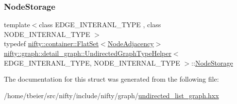 \mbox{\label{structnifty_1_1graph_1_1detail__graph_1_1UndirectedGraphTypeHelper_a55013bcacc1d016637b29ab2c33ac52a}} 
\subsubsection{\texorpdfstring{Node\+Storage}{NodeStorage}}
{\footnotesize\ttfamily template$<$class E\+D\+G\+E\+\_\+\+I\+N\+T\+E\+R\+A\+N\+L\+\_\+\+T\+Y\+PE , class N\+O\+D\+E\+\_\+\+I\+N\+T\+E\+R\+N\+A\+L\+\_\+\+T\+Y\+PE $>$ \\
typedef \hyperlink{classnifty_1_1container_1_1FlatSet}{nifty\+::container\+::\+Flat\+Set}$<$\hyperlink{structnifty_1_1graph_1_1detail__graph_1_1UndirectedGraphTypeHelper_a626e3edd4cc8c7e33ec89e6a7454561a}{Node\+Adjacency}$>$ \hyperlink{structnifty_1_1graph_1_1detail__graph_1_1UndirectedGraphTypeHelper}{nifty\+::graph\+::detail\+\_\+graph\+::\+Undirected\+Graph\+Type\+Helper}$<$ E\+D\+G\+E\+\_\+\+I\+N\+T\+E\+R\+A\+N\+L\+\_\+\+T\+Y\+PE, N\+O\+D\+E\+\_\+\+I\+N\+T\+E\+R\+N\+A\+L\+\_\+\+T\+Y\+PE $>$\+::\hyperlink{structnifty_1_1graph_1_1detail__graph_1_1UndirectedGraphTypeHelper_a55013bcacc1d016637b29ab2c33ac52a}{Node\+Storage}}



The documentation for this struct was generated from the following file\+:\begin{DoxyCompactItemize}
\item 
/home/tbeier/src/nifty/include/nifty/graph/\hyperlink{graph_2undirected__list__graph_8hxx}{undirected\+\_\+list\+\_\+graph.\+hxx}\end{DoxyCompactItemize}

